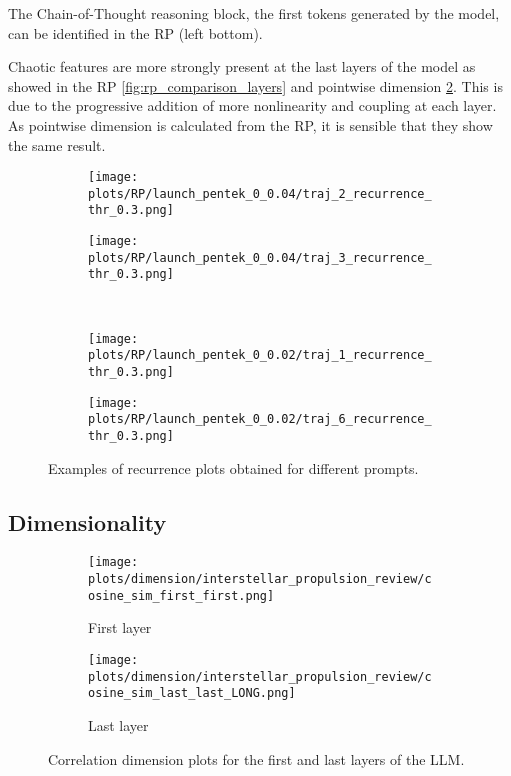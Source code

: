 \documentclass[a4paper,12pt]{article}
\begin{document}
The Chain-of-Thought reasoning block, the first tokens generated by the model, can be identified in the RP (left bottom).

Chaotic features are more strongly present at the last layers of the model as showed in the RP \ref{fig:rp_comparison_layers} and pointwise dimension \ref{fig:dim_first_last}. This is due to the progressive addition of more nonlinearity and coupling at each layer. As pointwise dimension is calculated from the RP, it is sensible that they show the same result.

\begin{figure}[H]
    \centering
    \begin{subfigure}[b]{0.48\textwidth}
        \centering
        \texttt{[image: plots/RP/launch\_pentek\_0\_0.04/traj\_2\_recurrence\_thr\_0.3.png]}
    \end{subfigure}\hfill
    \begin{subfigure}[b]{0.48\textwidth}
        \centering
        \texttt{[image: plots/RP/launch\_pentek\_0\_0.04/traj\_3\_recurrence\_thr\_0.3.png]}
    \end{subfigure}
    \\[0.5em]
    \begin{subfigure}[b]{0.48\textwidth}
        \centering
        \texttt{[image: plots/RP/launch\_pentek\_0\_0.02/traj\_1\_recurrence\_thr\_0.3.png]}
    \end{subfigure}\hfill
    \begin{subfigure}[b]{0.48\textwidth}
        \centering
        \texttt{[image: plots/RP/launch\_pentek\_0\_0.02/traj\_6\_recurrence\_thr\_0.3.png]}
    \end{subfigure}
    \caption{Examples of recurrence plots obtained for different prompts.}
    \label{fig:rp_interesting}
\end{figure}

\subsection{Dimensionality}

\begin{figure}[H]
    \centering
    \begin{subfigure}[b]{0.48\linewidth}
        \centering
        \texttt{[image: plots/dimension/interstellar\_propulsion\_review/cosine\_sim\_first\_first.png]}
        \caption{First layer}
    \end{subfigure}\hfill
    \begin{subfigure}[b]{0.48\linewidth}
        \centering
        \texttt{[image: plots/dimension/interstellar\_propulsion\_review/cosine\_sim\_last\_last\_LONG.png]}
        \caption{Last layer}
    \end{subfigure}
    \caption{Correlation dimension plots for the first and last layers of the LLM.}
    \label{fig:dim_first_last}
\end{figure}
\end{document}
